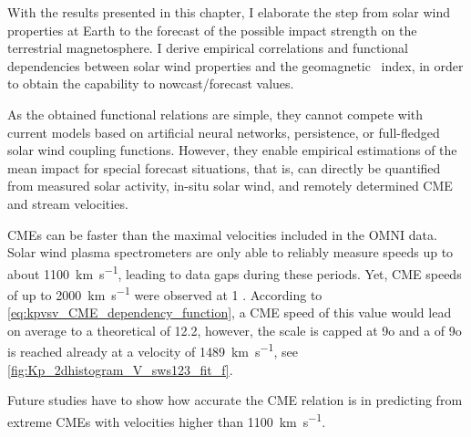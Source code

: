 With the results presented in this chapter, I elaborate the step from solar wind properties at Earth to the forecast of the possible impact strength on the terrestrial magnetosphere. I derive empirical correlations and functional dependencies between solar wind properties and the geomagnetic \Kp~index, in order to obtain the capability to nowcast/forecast \Kp{} values.

As the obtained functional relations are simple, they cannot compete with current models based on artificial neural networks, \Kp{} persistence, or full-fledged solar wind coupling functions. However, they enable empirical estimations of the mean \Kp{} impact for special forecast situations, that is, \Kp{} can directly be quantified from measured solar activity, in-situ solar wind, and remotely determined CME and stream velocities.

CMEs can be faster than the maximal velocities included in the OMNI data. Solar wind plasma spectrometers are only able to reliably measure speeds up to about \SI{1100}{\km\per\s}, leading to data gaps during these periods. Yet, CME speeds of up to \SI{2000}{\km\per\s} were observed at \SI{1}{\au} \citep{Russell2013}. According to \autoref{eq:kpvsv_CME_dependency_function}, a CME speed of this value would lead on average to a theoretical \Kp{} of 12.2, however, the \Kp{} scale is capped at 9o and a \Kp{} of 9o is reached already at a velocity of \SI{1489}{\km\per\s}, see \autoref{fig:Kp_2dhistogram_V_sws123_fit_f}.
\begin{figure}
\end{figure}
Future studies have to show how accurate the CME relation is in predicting \Kp{} from extreme CMEs with velocities higher than \SI{1100}{\km\per\s}.\\

